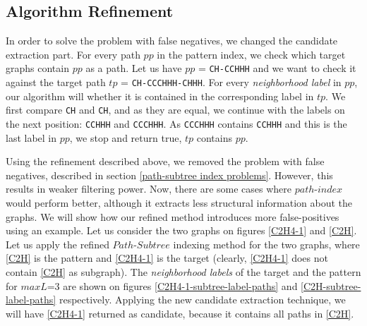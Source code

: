 \documentclass{l4proj}
\newcounter{example}[section]
\begin{document}
\subsection{Algorithm Refinement}
  In order to solve the problem with false negatives, we changed the candidate extraction part. For every path $pp$ in the pattern index, we check which target graphs contain $pp$ as a path. Let us have $pp$ = \texttt{CH-CCHHH} and we want to check it against the target path $tp$ = \texttt{CH-CCCHHH-CHHH}. For every \textit{neighborhood label} in $pp$, our algorithm will whether it is contained in the corresponding label in $tp$. We first compare \texttt{CH} and \texttt{CH}, and as they are equal, we continue with the labels on the next position: \texttt{CCHHH} and \texttt{CCCHHH}. As \texttt{CCCHHH} contains \texttt{CCHHH} and this is the last label in $pp$, we stop and return true, $tp$ contains $pp$.\par
Using the refinement described above, we removed the problem with false negatives, described in section \ref{path-subtree index problems}. However, this results in weaker filtering power. Now, there are some cases where $path$-$index$ would perform better, although it extracts less structural information about the graphs. We will show how our refined method introduces more false-positives using an example. Let us consider the two graphs on figures \ref{C2H4-1} and \ref{C2H}. Let us apply the refined $Path$-$Subtree$ indexing method for the two graphs, where \ref{C2H} is the pattern and \ref{C2H4-1} is the target (clearly, \ref{C2H4-1} does not contain \ref{C2H} as subgraph). The \textit{neighborhood labels} of the target and the pattern for $maxL$=3 are shown on figures \ref{C2H4-1-subtree-label-paths} and \ref{C2H-subtree-label-paths} respectively. Applying the new candidate extraction technique, we will have \ref{C2H4-1} returned as candidate, because it contains all paths in \ref{C2H}.\par
\end{document}
